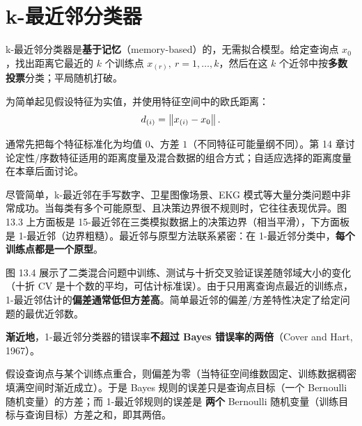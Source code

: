 \section{k-最近邻分类器}

\begin{definition}[k-最近邻分类]
k-最近邻分类器是\textbf{基于记忆}（memory-based）的，无需拟合模型。给定查询点 $x_0$，找出距离它最近的 $k$ 个训练点 $x_{(r)},\ r=1,\dots,k$，然后在这 $k$ 个近邻中按\textbf{多数投票}分类；平局随机打破。
\end{definition}

为简单起见假设特征为实值，并使用特征空间中的欧氏距离：
\begin{equation}
d_{(i)} = \left\lVert x_{(i)} - x_0\right\rVert. \label{eq:13_1}
\end{equation}

通常先把每个特征标准化为均值 $0$、方差 $1$（不同特征可能量纲不同）。第 14 章讨论定性/序数特征适用的距离度量及混合数据的组合方式；自适应选择的距离度量在本章后面讨论。

\begin{remark}[成功与适用场景]
尽管简单，k-最近邻在手写数字、卫星图像场景、EKG 模式等大量分类问题中非常成功。当每类有多个可能原型、且决策边界很不规则时，它往往表现优异。图 13.3 上方面板是 15-最近邻在三类模拟数据上的决策边界（相当平滑），下方面板是 1-最近邻（边界粗糙）。最近邻与原型方法联系紧密：在 1-最近邻分类中，\textbf{每个训练点都是一个原型}。
\end{remark}

\begin{remark}[偏差--方差与邻域大小]
图 13.4 展示了二类混合问题中训练、测试与十折交叉验证误差随邻域大小的变化（十折 CV 是十个数的平均，可估计标准误）。由于只用离查询点最近的训练点，1-最近邻估计的\textbf{偏差通常低但方差高}。简单最近邻的偏差/方差特性决定了给定问题的最优近邻数。
\end{remark}

\begin{theorem}
\textbf{渐近地}，1-最近邻分类器的错误率\textbf{不超过 Bayes 错误率的两倍}（Cover and Hart, 1967）。
\end{theorem}

\begin{remark}
假设查询点与某个训练点重合，则偏差为零（当特征空间维数固定、训练数据稠密填满空间时渐近成立）。于是 Bayes 规则的误差只是查询点目标（一个 Bernoulli 随机变量）的方差；而 1-最近邻规则的误差是 \textbf{两个} Bernoulli 随机变量（训练目标与查询目标）方差之和，即其两倍。
\end{remark}

